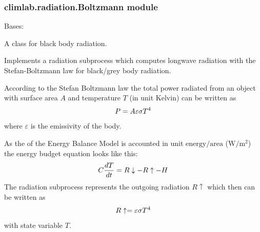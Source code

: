 \documentclass[letterpaper,10pt,english]{sphinxmanual}
\begin{document}
\subsubsection{climlab.radiation.Boltzmann module}
\label{api/climlab.radiation:climlab-radiation-boltzmann-module}\label{api/climlab.radiation:module-climlab.radiation.Boltzmann}

\begin{fulllineitems}
\label{api/climlab.radiation:climlab.radiation.Boltzmann.Boltzmann}
Bases: {\hyperref[api/climlab.process:climlab.process.energy_budget.EnergyBudget]{\emph{}}}

A class for black body radiation.

Implements a radiation subprocess which computes longwave radiation
with the Stefan-Boltzmann law for black/grey body radiation.

According to the Stefan Boltzmann law the total power radiated from an 
object with surface area \(A\) and temperature \(T\) (in unit Kelvin)
can be written as
\begin{gather}
\begin{split}P = A \varepsilon \sigma T^4\end{split}\notag
\end{gather}
where \(\varepsilon\) is the emissivity of the body.

As the {\hyperref[api/climlab.process:climlab.process.energy_budget.EnergyBudget]{\emph{}}} of the 
Energy Balance Model is accounted in unit \(\textrm{energy} / \textrm{area}\)
(\(\textrm{W}/ \textrm{m}^2\))
the energy budget equation looks like this:
\begin{gather}
\begin{split}C \frac{dT}{dt} = R\downarrow - R\uparrow - H  \end{split}\notag
\end{gather}
The {\hyperref[api/climlab.radiation:climlab.radiation.Boltzmann.Boltzmann]{\emph{}}} radiation subprocess represents the outgoing radiation
\(R\uparrow\) which then can be written as
\begin{gather}
\begin{split}R\uparrow = \varepsilon \sigma T^4\end{split}\notag
\end{gather}
with state variable \(T\).


\end{fulllineitems}
\end{document}
